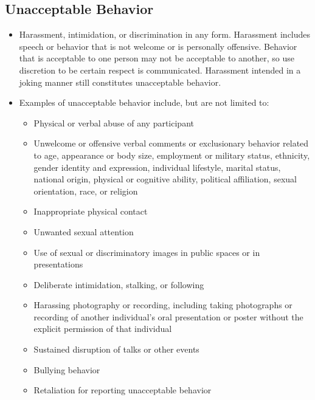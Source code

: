 \subsection{Unacceptable Behavior}

\begin{itemize}[noitemsep,topsep=0pt,parsep=0pt,partopsep=0pt]
  
\item Harassment, intimidation, or discrimination in any
  form. Harassment includes speech or behavior that is not welcome or is
  personally offensive. Behavior that is acceptable to one person may
  not be acceptable to another, so use discretion to be certain respect
  is communicated. Harassment intended in a joking manner still
  constitutes unacceptable behavior.

\item Examples of unacceptable behavior include, but are not limited to:

  \begin{itemize}[noitemsep,topsep=0pt,parsep=0pt,partopsep=0pt]  

  \item Physical or verbal abuse of any participant
  \item Unwelcome or offensive verbal comments or exclusionary behavior
  related to age, appearance or body size, employment or military
  status, ethnicity, gender identity and expression, individual
  lifestyle, marital status, national origin, physical or cognitive
  ability, political affiliation, sexual orientation, race, or religion

\item Inappropriate physical contact
  
\item Unwanted sexual attention
  
\item Use of sexual or discriminatory images in public spaces or in
  presentations 

\item Deliberate intimidation, stalking, or following
  
\item Harassing photography or recording, including taking photographs
  or recording of another individual’s oral presentation or poster
  without the explicit permission of that individual 
\item Sustained disruption of talks or other events
\item Bullying behavior
\item Retaliation for reporting unacceptable behavior
\end{itemize}
\end{itemize}

